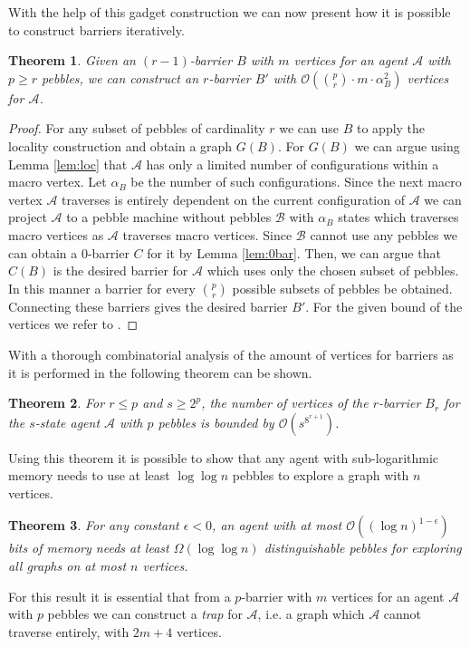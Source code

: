 \documentclass[oneside]{scrartcl}
\newtheorem{thm}{Theorem}
\begin{document}
With the help of this gadget construction we can now present how it is possible
to construct barriers iteratively.
\begin{thm}
  Given an $(r-1)$-barrier $B$ with $m$ vertices for an agent $\mathcal{A}$
  with $p\geq r$ pebbles, we can construct an $r$-barrier $B'$ with
  $\mathcal{O}({{p}\choose{r}}\cdot m\cdot \alpha_{B}^{2})$ vertices for
  $\mathcal{A}$.
\end{thm}
\begin{proof}
  For any subset of pebbles of cardinality $r$ we can use $B$ to apply the
  locality construction and obtain a graph $G(B)$. For $G(B)$ we can argue
  using Lemma \ref{lem:loc} that $\mathcal{A}$ has only a limited
  number of configurations within a macro vertex. Let $\alpha_{B}$ be the
  number of such configurations. Since the next macro vertex $\mathcal{A}$
  traverses is entirely dependent on the current configuration of $\mathcal{A}$
  we can project $\mathcal{A}$ to a pebble machine without pebbles
  $\mathcal{B}$ with $\alpha_{B}$ states which traverses macro vertices as
  $\mathcal{A}$ traverses macro vertices.
  Since $\mathcal{B}$ cannot use any pebbles we can
  obtain a $0$-barrier $C$ for it by Lemma \ref{lem:0bar}. Then, we can argue
  that $C(B)$ is the desired barrier for $\mathcal{A}$ which uses only the
  chosen subset of pebbles. In this manner a barrier for every ${p}\choose{r}$
  possible subsets of pebbles be obtained. Connecting these barriers gives
  the desired barrier $B'$. For the given bound of the vertices we refer to
  \cite{pebbles}.
\end{proof}
With a thorough combinatorial analysis of the amount of vertices for barriers
as it is performed in \cite{pebbles} the following theorem can be shown.
\begin{thm}
  For $r\leq p$ and $s \geq 2^{p}$, the number of vertices of the $r$-barrier
  $B_{r}$ for the $s$-state agent $\mathcal{A}$ with $p$ pebbles is bounded by
  $\mathcal{O}(s^{8^{r+1}})$.
\end{thm}
Using this theorem it is possible to show that any agent with sub-logarithmic
memory needs to use at least $\log\log n$ pebbles to explore a graph with $n$
vertices.
\begin{thm}
  For any constant $\epsilon < 0$, an agent with at most
  $\mathcal{O}((\log n)^{1-\epsilon})$ bits of memory needs at least
  $\Omega(\log\log n)$ distinguishable pebbles for exploring all graphs on at
  most $n$ vertices.
\end{thm}
For this result it is essential that from a $p$-barrier with $m$
vertices for an agent $\mathcal{A}$ with $p$ pebbles we can construct a
\emph{trap} for $\mathcal{A}$, i.e. a graph which $\mathcal{A}$ cannot
traverse entirely, with $2m+4$ vertices.
\end{document}
